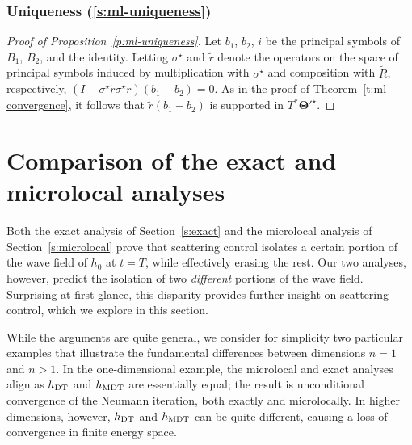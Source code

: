 \documentclass[10pt]{article}
\theoremstyle{plain}
\theoremstyle{definition}
\theoremstyle{remark}
\numberwithin{theorem}{section}
\numberwithin{example}{section}
\numberwithin{equation}{section}
\numberwithin{figure}{section}
\newcommand\sref[1]{\textsection\ref{#1}}					%
\newcommand\bTheta{\boldsymbol\Theta}
\newcommand\DT{\ensuremath{_{\text{\normalfont DT}}}}		%
\newcommand\MDT{\ensuremath{_{\text{\normalfont MDT}}}}	%
\begin{document}
\subsubsection{Uniqueness (\sref{s:ml-uniqueness})}

\begin{proof}[Proof of Proposition~\ref{p:ml-uniqueness}]
	Let $b_1$, $b_2$, $i$ be the principal symbols of $B_1$, $B_2$, and the identity. Letting $\sigma^\star$ and $\tilde r$ denote the operators on the space of principal symbols induced by multiplication with $\sigma^\star$ and composition with $\tilde R$, respectively, $(I-\sigma^\star\tilde r\sigma^\star\tilde r)(b_1-b_2)=0$. As in the proof of Theorem~\ref{t:ml-convergence}, it follows that $\tilde r(b_1-b_2)$ is supported in $T^*\bTheta'^\star$.
\end{proof}













\section{Comparison of the exact and microlocal analyses}					\label{s:compare}

Both the exact analysis of Section~\ref{s:exact} and the microlocal analysis of Section~\ref{s:microlocal} prove that scattering control isolates a certain portion of the wave field of $h_0$ at $t=T$, while effectively erasing the rest. Our two analyses, however, predict the isolation of two \emph{different} portions of the wave field. Surprising at first glance, this disparity provides further insight on scattering control, which we explore in this section.

While the arguments are quite general, we consider for simplicity two particular examples that illustrate the fundamental differences between dimensions $n=1$ and $n>1$. In the one-dimensional example, the microlocal and exact analyses align as $h\DT$ and $h\MDT$ are essentially equal; the result is unconditional convergence of the Neumann iteration, both exactly and microlocally. In higher dimensions, however, $h\DT$ and $h\MDT$ can be quite different, causing a loss of convergence in finite energy space.



\end{document}
